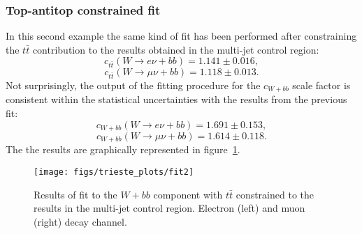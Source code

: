 \subsubsection{Top-antitop constrained fit}
In this second example the same kind of fit has been performed 
after constraining the $t\bar{t}$ contribution to the results 
obtained in the multi-jet control region:
$$c_{t\bar{t}}(W \rightarrow e \nu + bb) = 1.141 \pm 0.016 \mathrm{,}$$
$$c_{t\bar{t}}(W \rightarrow \mu \nu + bb) = 1.118 \pm 0.013 \mathrm{.}$$
Not surprisingly, the output of the fitting procedure for the 
$c_{W+bb}$ scale factor is consistent within the statistical uncertainties
with the results from the previous fit: 
$$c_{W+bb}(W \rightarrow e \nu + bb) = 1.691 \pm 0.153 \mathrm{,}$$
$$c_{W+bb}(W \rightarrow \mu \nu + bb) = 1.614 \pm 0.118 \mathrm{.}$$
The the results are graphically represented in figure~\ref{fig:intermediatefit1}.
\begin{figure}[htb]
	\begin{center}
		\leavevmode
		\texttt{[image: figs/trieste\_plots/fit2]}
	\end{center}
	\caption{Results of fit to the $W + bb$ component with $t\bar{t}$ constrained to the 
          results in the multi-jet control region. Electron (left) and 
          muon (right) decay channel.}
	\label{fig:intermediatefit1}
\end{figure}

